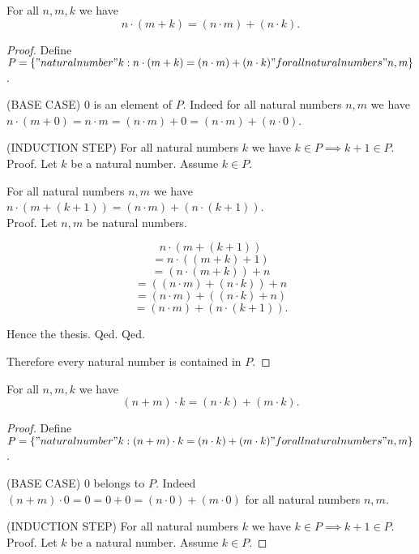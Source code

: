 \documentclass[../../natural-numbers.ftl.tex]{subfiles}
\begin{document}
  \begin{forthel}
    \begin{proposition}[NN 01 03 539933]
      For all $n,m,k$ we have
      $$n \cdot (m + k) = (n \cdot m) + (n \cdot k).$$
    \end{proposition}
    \begin{proof}
      Define $P = \{ "natural number" k : n \cdot (m + k) = (n \cdot m) + (n \cdot k) "for all natural numbers" n,m \}$.

      (BASE CASE) $0$ is an element of $P$.
      Indeed for all natural numbers $n,m$ we have $n \cdot (m + 0) = n \cdot m = (n \cdot m) + 0 = (n \cdot m) + (n \cdot 0)$.

      (INDUCTION STEP) For all natural numbers $k$ we have $k \in P \implies k + 1 \in P$. \\
      Proof.
        Let $k$ be a natural number.
        Assume $k \in P$.

        For all natural numbers $n,m$ we have $n \cdot (m + (k + 1)) = (n \cdot m) + (n \cdot (k + 1))$. \\
        Proof.
          Let $n,m$ be natural numbers.

          $$n \cdot (m + (k + 1))$$
          $$= n \cdot ((m + k) + 1)$$             %
          $$= (n \cdot (m + k)) + n$$             %
          $$= ((n \cdot m) + (n \cdot k)) + n$$   %
          $$= (n \cdot m) + ((n \cdot k) + n)$$   %
          $$= (n \cdot m) + (n \cdot (k + 1)).$$  %

          Hence the thesis.
        Qed.
      Qed.

      Therefore every natural number is contained in $P$.
    \end{proof}


    \begin{proposition}[NN 01 03 322712]
      For all $n,m,k$ we have
      $$(n + m) \cdot k = (n \cdot k) + (m \cdot k).$$
    \end{proposition}
    \begin{proof}
      Define $P = \{ "natural number" k : (n + m) \cdot k = (n \cdot k) + (m \cdot k) "for all natural numbers" n,m \}$.

      (BASE CASE) $0$ belongs to $P$.
      Indeed $(n + m) \cdot 0 = 0 = 0 + 0 = (n \cdot 0) + (m \cdot 0)$ for all natural numbers $n,m$.

      (INDUCTION STEP) For all natural numbers $k$ we have $k \in P \implies k + 1 \in P$. \\
      Proof.
        Let $k$ be a natural number.
        Assume $k \in P$.


\end{proof}
\end{forthel}
\end{document}
